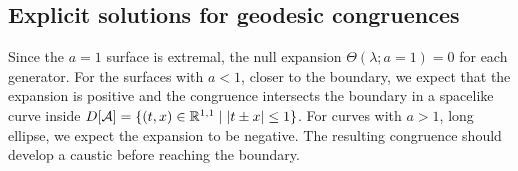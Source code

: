 \documentclass[12pt]{article}
\def\regA{{\cal A}}
\def\domdA{D[\regA]}
\begin{document}
\subsection{Explicit solutions for geodesic congruences}

Since the $a=1$ surface is extremal, the null expansion $\Theta(\lambda; a=1) = 0$ for each generator.  For the surfaces with $a < 1$, closer to the boundary, we expect that the expansion is positive and the congruence intersects the boundary in a spacelike curve inside 
$\domdA = \{(t,x) \in {\mathbb R}^{1,1} \mid |t \pm x| \leq 1 \}$.   
For curves with $a>1$, long ellipse, we expect the expansion to be negative.  The resulting congruence should develop a caustic before reaching the boundary.
\end{document}

